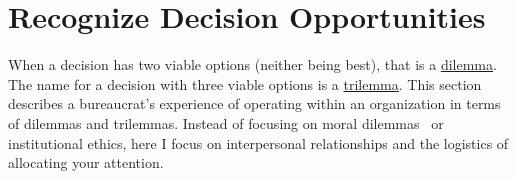 \section{Recognize Decision Opportunities\label{sec:dilemma-trilemma}}



When a decision has two viable options (neither being best), that is a \href{https://en.wikipedia.org/wiki/Dilemma}{dilemma}. 
The name for a decision with three viable options is a \href{https://en.wikipedia.org/wiki/Trilemma}{trilemma}. 
This section describes a bureaucrat's experience of operating within an organization in terms of dilemmas and trilemmas. Instead of focusing on moral dilemmas~\cite{2017_Zacka} or institutional ethics, here I focus on interpersonal relationships and the logistics of allocating your attention. 

